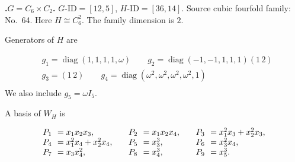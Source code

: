 \documentclass[12pt]{amsart}
\makeatletter
\numberwithin{equation}{section}
\theoremstyle{plain}
\theoremstyle{definition}
\theoremstyle{remark}
\DeclareMathOperator{\diag}{diag}
\newcommand{\PBasisLabel}[1]{\mathrlap{P_{#1}}\phantom{P_{99}}}
\newenvironment{SecEightAlignedBasis}[1]{%
  \begingroup\renewcommand{\arraystretch}{1.18}%
  \[\begin{array}{@{}#1@{}}%
}{\end{array}\]\endgroup}
\newenvironment{familydisplay}{%
  \begingroup
  \setlength{\arraycolsep}{1.35pt}%
  \renewcommand{\arraystretch}{0.96}%
  \setlength{\jot}{2pt}%
}{\endgroup}
\makeatother
\begin{document}
\par{}\medskip\noindent\textbf{.\enspace $G=C_6\times C_2$.}\label{fam:threefold-no-15}
$G\text{-ID}=[12,5]$, $H\text{-ID}=[36,14]$.
Source cubic fourfold family: No.~64.  Here
$H\cong C_6^2$.
The family dimension is $2$.
\par\smallskip\noindent Generators of $H$ are\par\nopagebreak
\begin{familydisplay}
\begin{align*}
&g_{1}=\diag(1,1,1,1,\omega)\qquad
g_{2}=\diag(-1,-1,1,1,1)(1\,2)\\
&g_{3}=(1\,2)\qquad g_{4}=\diag(\omega^2,\omega^2,\omega^2,\omega^2,1)\\
\end{align*}
\end{familydisplay}
\noindent We also include $g_{5}=\omega I_5$.
\par\smallskip\noindent A basis of $W_H$ is\par\nopagebreak
\begin{familydisplay}
\begin{SecEightAlignedBasis}{l@{\qquad}l@{\qquad}l}
\PBasisLabel{1}=x_{1}x_{2}x_{3}, & \PBasisLabel{2}=x_{1}x_{2}x_{4}, & \PBasisLabel{3}=x_{1}^{2}x_{3}+x_{2}^{2}x_{3},\\
\PBasisLabel{4}=x_{1}^{2}x_{4}+x_{2}^{2}x_{4}, & \PBasisLabel{5}=x_{3}^{3}, & \PBasisLabel{6}=x_{3}^{2}x_{4},\\
\PBasisLabel{7}=x_{3}x_{4}^{2}, & \PBasisLabel{8}=x_{4}^{3}, & \PBasisLabel{9}=x_{5}^{3}.
\end{SecEightAlignedBasis}
\end{familydisplay}
\end{document}

